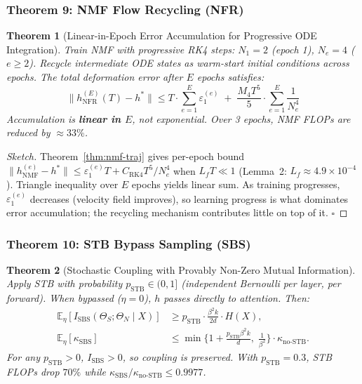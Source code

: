 \documentclass{scpe}
\newtheorem{theorem}{Theorem}[section]
\begin{document}
\subsubsection{Theorem 9: NMF Flow Recycling (NFR)}

\begin{theorem}[Linear-in-Epoch Error Accumulation for Progressive ODE Integration]
\label{thm:nfr}
Train NMF with progressive RK4 steps: $N_1=2$ (epoch 1), $N_e=4$ ($e \geq 2$). Recycle intermediate ODE states as warm-start initial conditions across epochs. The total deformation error after $E$ epochs satisfies:
\begin{equation}
\|h_{\text{NFR}}^{(E)}(T) - h^*\| \leq T \cdot \sum_{e=1}^E \varepsilon_1^{(e)} \;+\; \frac{M_4 T^5}{5} \cdot \sum_{e=1}^E \frac{1}{N_e^4}
\end{equation}
Accumulation is \textbf{linear in $E$}, not exponential. Over 3 epochs, NMF FLOPs are reduced by $\approx 33\%$.
\end{theorem}

\begin{proof}[Sketch]
Theorem~\ref{thm:nmf-traj} gives per-epoch bound $\|h_{\text{NMF}}^{(e)} - h^*\| \leq \varepsilon_1^{(e)} T + C_{\text{RK4}} T^5/N_e^4$ when $L_f T \ll 1$ (Lemma~2: $L_f \approx 4.9\times 10^{-4}$). Triangle inequality over $E$ epochs yields linear sum. As training progresses, $\varepsilon_1^{(e)}$ decreases (velocity field improves), so learning progress is what dominates error accumulation; the recycling mechanism contributes little on top of it. $\square$
\end{proof}

\subsubsection{Theorem 10: STB Bypass Sampling (SBS)}

\begin{theorem}[Stochastic Coupling with Provably Non-Zero Mutual Information]
\label{thm:sbs}
Apply STB with probability $p_{\text{STB}} \in (0,1]$ (independent Bernoulli per layer, per forward). When bypassed ($\eta=0$), $h$ passes directly to attention. Then:
\begin{align}
\mathbb{E}_\eta[I_{\text{SBS}}(\Theta_S; \Theta_N \mid X)] &\geq p_{\text{STB}} \cdot \frac{\beta^2 k}{2d} \cdot H(X), \\
\mathbb{E}_\eta[\kappa_{\text{SBS}}] &\leq \min\!\Big\{1 + \frac{p_{\text{STB}}\beta^2 k}{d},\; \frac{1}{\beta^2}\Big\} \cdot \kappa_{\text{no-STB}}.
\end{align}
For any $p_{\text{STB}} > 0$, $I_{\text{SBS}} > 0$, so coupling is preserved. With $p_{\text{STB}}=0.3$, STB FLOPs drop $70\%$ while $\kappa_{\text{SBS}}/\kappa_{\text{no-STB}} \leq 0.9977$.
\end{theorem}
\end{document}
